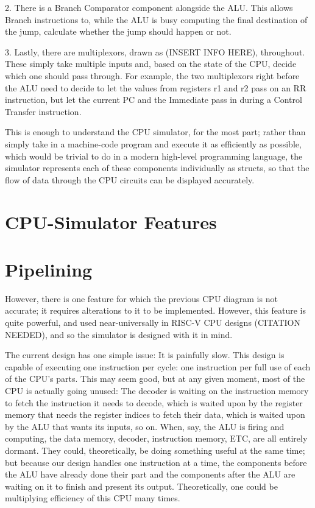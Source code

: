 \documentclass[12pt,twoside]{reedthesis}
\begin{document}
2. There is a Branch Comparator component alongside the ALU. This allows Branch instructions to, while the ALU is busy computing the final destination of the jump, calculate whether the jump should happen or not.

3. Lastly, there are multiplexors, drawn as (INSERT INFO HERE), throughout. These simply take multiple inputs and, based on the state of the CPU, decide which one should pass through. For example, the two multiplexors right before the ALU need to decide to let the values from registers r1 and r2 pass on an RR instruction, but let the current PC and the Immediate pass in during a Control Transfer instruction.

This is enough to understand the CPU simulator, for the most part; rather than simply take in a machine-code program and execute it as efficiently as possible, which would be trivial to do in a modern high-level programming language, the simulator represents each of these components individually as structs, so that the flow of data through the CPU circuits can be displayed accurately.

\section{CPU-Simulator Features}

\section{Pipelining}

However, there is one feature for which the previous CPU diagram is not accurate; it requires alterations to it to be implemented. However, this feature is quite powerful, and used near-universally in RISC-V CPU designs (CITATION NEEDED), and so the simulator is designed with it in mind.

The current design has one simple issue: It is painfully slow. This design is capable of executing one instruction per cycle: one instruction per full use of each of the CPU's parts. This may seem good, but at any given moment, most of the CPU is actually going unused: The decoder is waiting on the instruction memory to fetch the instruction it needs to decode, which is waited upon by the register memory that needs the register indices to fetch their data, which is waited upon by the ALU that wants its inputs, so on. When, say, the ALU is firing and computing, the data memory, decoder, instruction memory, ETC, are all entirely dormant. They could, theoretically, be doing something useful at the same time; but because our design handles one instruction at a time, the components before the ALU have already done their part and the components after the ALU are waiting on it to finish and present its output. Theoretically, one could be multiplying efficiency of this CPU many times.
\end{document}
